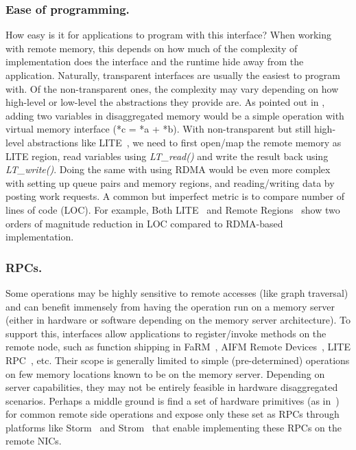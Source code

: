 \subsubsection{Ease of programming.} 
How easy is it for applications to program with this interface? 
When working with remote memory, this depends on how much of the 
complexity of implementation does the interface and the runtime 
hide away from the application. Naturally, transparent interfaces
are usually the easiest to program with. Of the non-transparent 
ones, the complexity may vary depending on how high-level or 
low-level the abstractions they provide are. As pointed out in
\cite{Aguilera2017}, adding two variables in disaggregated memory
would be a simple operation with virtual memory interface 
(*c = *a + *b). With non-transparent but still high-level 
abstractions like LITE~\cite{literdma}, we need to first open/map
the remote memory as LITE region, read variables using \textit{
LT\_read()} and write the result back using \textit{LT\_write()}.
Doing the same with using RDMA would be even more complex with 
setting up queue pairs and memory regions, and reading/writing 
data by posting work requests. A common but imperfect metric is 
to compare number of lines of code (LOC). For example, Both
LITE~\cite{literdma} and Remote Regions~\cite{remregions} show 
two orders of magnitude reduction in LOC compared to RDMA-based 
implementation. 
    
\subsubsection{RPCs.} Some operations may be 
highly sensitive to remote accesses (like graph traversal) 
and can benefit immensely from having the operation 
run on a memory server (either in hardware or software 
depending on the memory server architecture). To support this,
interfaces allow applications to register/invoke methods on 
the remote node, such as function shipping in FaRM~\cite{farm}, 
AIFM Remote Devices~\cite{aifm}, LITE RPC~\cite{literdma}, etc.
Their scope is generally limited to simple (pre-determined) 
operations on few memory locations known to be on the memory 
server. Depending on server capabilities, they may not be
entirely feasible in hardware disaggregated scenarios.
Perhaps a middle ground is find a set of hardware primitives 
(as in~\cite{Aguilera2019}) for common remote side operations and 
expose only these set as RPCs through platforms like 
Storm~\cite{storm} and Strom~\cite{strom} that enable  
implementing these RPCs on the remote NICs.    

